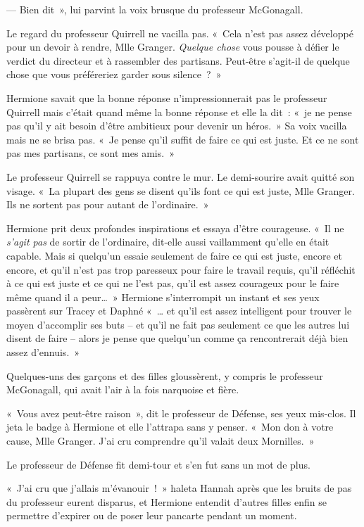 --- Bien dit~», lui parvint la voix brusque du professeur McGonagall.

Le regard du professeur Quirrell ne vacilla pas.
«~Cela n'est pas assez développé pour un devoir à rendre, Mlle Granger.
\emph{Quelque chose} vous pousse à défier le verdict du directeur et à rassembler des partisans.
Peut-être s'agit-il de quelque chose que vous préféreriez garder sous silence~?~»

Hermione savait que la bonne réponse n'impressionnerait pas le professeur Quirrell mais c'était quand même la bonne réponse et elle la dit~: «~je ne pense pas qu'il y ait besoin d'être ambitieux pour devenir un héros.~»
Sa voix vacilla mais ne se brisa pas.
«~Je pense qu'il suffit de faire ce qui est juste.
Et ce ne sont pas mes partisans, ce sont mes amis.~»

Le professeur Quirrell se rappuya contre le mur.
Le demi-sourire avait quitté son visage.
«~La plupart des gens se disent qu'ils font ce qui est juste, Mlle Granger.
Ils ne sortent pas pour autant de l'ordinaire.~»

Hermione prit deux profondes inspirations et essaya d'être courageuse.
«~Il ne \emph{s'agit pas} de sortir de l'ordinaire, dit-elle aussi vaillamment qu'elle en était capable.
Mais si quelqu'un essaie seulement de faire ce qui est juste, encore et encore, et qu'il n'est pas trop paresseux pour faire le travail requis, qu'il réfléchit à ce qui est juste et ce qui ne l'est pas, qu'il est assez courageux pour le faire même quand il a peur…~»
Hermione s'interrompit un instant et ses yeux passèrent sur Tracey et Daphné «~… et qu'il est assez intelligent pour trouver le moyen d'accomplir ses buts -- et qu'il ne fait pas seulement ce que les autres lui disent de faire -- alors je pense que quelqu'un comme ça rencontrerait déjà bien assez d'ennuis.~»

Quelques-uns des garçons et des filles gloussèrent, y compris le professeur McGonagall, qui avait l'air à la fois narquoise et fière.

«~Vous avez peut-être raison~», dit le professeur de Défense, ses yeux mis-clos.
Il jeta le badge à Hermione et elle l'attrapa sans y penser.
«~Mon don à votre cause, Mlle Granger.
J'ai cru comprendre qu'il valait deux Mornilles.~»

Le professeur de Défense fit demi-tour et s'en fut sans un mot de plus.

«~J'ai cru que j'allais m'évanouir~!~»
haleta Hannah après que les bruits de pas du professeur eurent disparus, et Hermione entendit d'autres filles enfin se permettre d'expirer ou de poser leur pancarte pendant un moment.

